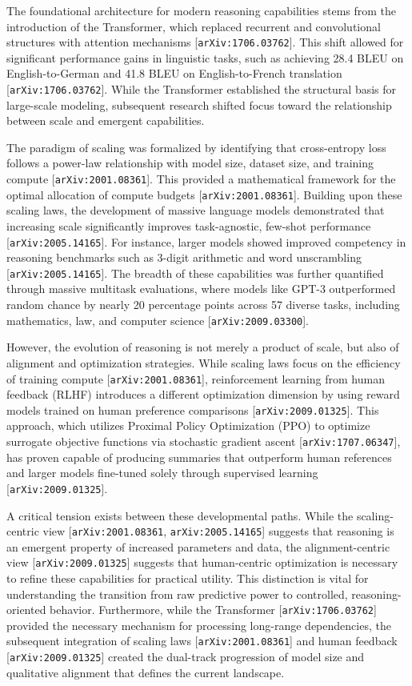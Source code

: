 \documentclass[11pt]{article}
\begin{document}
The foundational architecture for modern reasoning capabilities stems from the introduction of the Transformer, which replaced recurrent and convolutional structures with attention mechanisms [\texttt{arXiv:1706.03762}]. This shift allowed for significant performance gains in linguistic tasks, such as achieving 28.4 BLEU on English-to-German and 41.8 BLEU on English-to-French translation [\texttt{arXiv:1706.03762}]. While the Transformer established the structural basis for large-scale modeling, subsequent research shifted focus toward the relationship between scale and emergent capabilities.

The paradigm of scaling was formalized by identifying that cross-entropy loss follows a power-law relationship with model size, dataset size, and training compute [\texttt{arXiv:2001.08361}]. This provided a mathematical framework for the optimal allocation of compute budgets [\texttt{arXiv:2001.08361}]. Building upon these scaling laws, the development of massive language models demonstrated that increasing scale significantly improves task-agnostic, few-shot performance [\texttt{arXiv:2005.14165}]. For instance, larger models showed improved competency in reasoning benchmarks such as 3-digit arithmetic and word unscrambling [\texttt{arXiv:2005.14165}]. The breadth of these capabilities was further quantified through massive multitask evaluations, where models like GPT-3 outperformed random chance by nearly 20 percentage points across 57 diverse tasks, including mathematics, law, and computer science [\texttt{arXiv:2009.03300}].

However, the evolution of reasoning is not merely a product of scale, but also of alignment and optimization strategies. While scaling laws focus on the efficiency of training compute [\texttt{arXiv:2001.08361}], reinforcement learning from human feedback (RLHF) introduces a different optimization dimension by using reward models trained on human preference comparisons [\texttt{arXiv:2009.01325}]. This approach, which utilizes Proximal Policy Optimization (PPO) to optimize surrogate objective functions via stochastic gradient ascent [\texttt{arXiv:1707.06347}], has proven capable of producing summaries that outperform human references and larger models fine-tuned solely through supervised learning [\texttt{arXiv:2009.01325}].

A critical tension exists between these developmental paths. While the scaling-centric view [\texttt{arXiv:2001.08361}, \texttt{arXiv:2005.14165}] suggests that reasoning is an emergent property of increased parameters and data, the alignment-centric view [\texttt{arXiv:2009.01325}] suggests that human-centric optimization is necessary to refine these capabilities for practical utility. This distinction is vital for understanding the transition from raw predictive power to controlled, reasoning-oriented behavior. Furthermore, while the Transformer [\texttt{arXiv:1706.03762}] provided the necessary mechanism for processing long-range dependencies, the subsequent integration of scaling laws [\texttt{arXiv:2001.08361}] and human feedback [\texttt{arXiv:2009.01325}] created the dual-track progression of model size and qualitative alignment that defines the current landscape.
\end{document}
